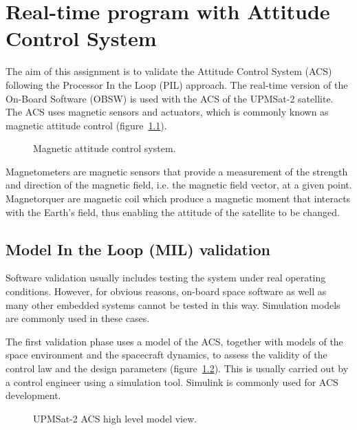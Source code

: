 \chapter{Real-time program with Attitude Control System}\label{ch:assignment7}

The aim of this assignment is to validate the Attitude Control System (ACS) following the Processor In the Loop (PIL) approach. The real-time version of the On-Board Software (OBSW) is used with the ACS of the UPMSat-2 satellite. The ACS uses magnetic sensors and actuators, which is commonly known as magnetic attitude control (figure~\ref{fig:acs}).

\begin{figure}[h]
            \caption{Magnetic attitude control system.}
            \label{fig:acs}
\end{figure}

Magnetometers are magnetic sensors that provide a measurement of the strength and direction of the magnetic field, i.e. the magnetic field vector, at a given point. Magnetorquer are magnetic coil which produce a magnetic moment that interacts with the Earth's field, thus enabling the attitude of the satellite to be changed.

\section{Model In the Loop (MIL) validation}

Software validation usually includes testing the system under real operating conditions. However, for obvious reasons, on-board space software as well as many other embedded systems cannot be tested in this way. Simulation models are commonly used in these cases.

The first validation phase uses a model of the ACS, together with models of the space environment and the spacecraft dynamics, to assess the validity of the control law and the design parameters (figure~\ref{fig:acs-hl}). This is usually carried out by a control engineer using a simulation tool. Simulink is commonly used for ACS development.

\begin{figure}[h]
            \caption{UPMSat-2 ACS high level model view.}
            \label{fig:acs-hl}
\end{figure}

